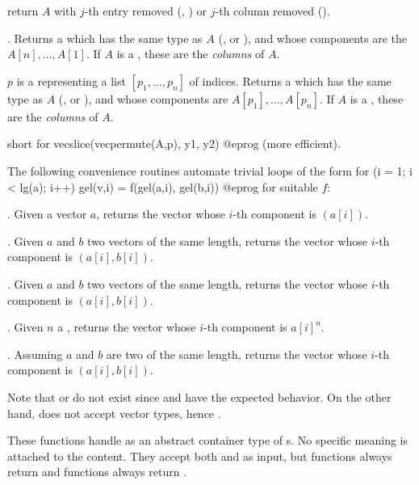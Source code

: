  return $A$ with $j$-th entry removed
(, ) or $j$-th column removed ().

. Returns a  which has the same
type as $A$ (,  or ), and whose components
are the $A[n],\dots,A[1]$. If $A$ is a , these are the
\emph{columns} of $A$.

 $p$ is a  representing
a list $[p_1,\dots,p_n]$ of indices. Returns a  which has the same
type as $A$ (,  or ), and whose components
are $A[p_1],\dots,A[p_n]$. If $A$ is a , these are the
\emph{columns} of $A$.

 short for
\bprog
  vecslice(vecpermute(A,p), y1, y2)
@eprog\noindent
(more efficient).


The following convenience routines automate trivial loops of the form
\bprog
  for (i = 1; i < lg(a); i++) gel(v,i) = f(gel(a,i), gel(b,i))
@eprog\noindent
for suitable $f$:

. Given a vector $a$,
returns the vector whose $i$-th component is $(a[i])$.

. Given $a$ and $b$ two vectors of the same
length, returns the vector whose $i$-th component is $(a[i], b[i])$.

. Given $a$ and $b$ two vectors of the same
length, returns the vector whose $i$-th component is $(a[i], b[i])$.

. Given $n$ a , returns
the vector whose $i$-th component is $a[i]^n$.

. Assuming $a$ and $b$ are two 
of the same length, returns the vector whose $i$-th component
is $(a[i], b[i])$.

Note that  or  do not exist since 
and  have the expected behavior. On the other hand,
 does not accept vector types, hence .


These functions handle  as an abstract container type of
s. No specific meaning is attached to the content. They accept both
 and  as input, but  functions always return
 and  functions always return .

